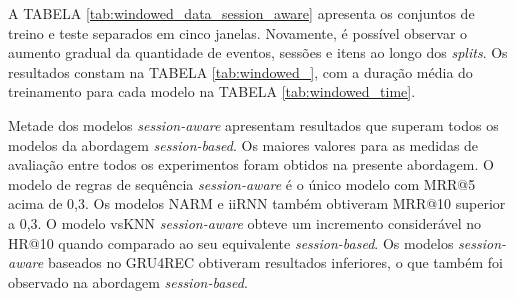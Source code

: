 A TABELA \ref{tab:windowed_data_session_aware} apresenta os conjuntos de treino
e teste separados em cinco janelas. Novamente, é possível observar o aumento
gradual da quantidade de eventos, sessões e itens ao longo dos \textit{splits}.
Os resultados constam na TABELA \ref{tab:windowed_}, com a duração
média do treinamento para cada modelo na TABELA \ref{tab:windowed_time}.

Metade dos modelos \textit{session-aware} apresentam resultados que superam
todos os modelos da abordagem \textit{session-based}. Os maiores valores para as
medidas de avaliação entre todos os experimentos foram obtidos na presente
abordagem. O modelo de regras de sequência \textit{session-aware} é o único
modelo com MRR@5 acima de 0,3. Os modelos NARM e iiRNN também obtiveram MRR@10
superior a 0,3. O modelo vsKNN \textit{session-aware} obteve um incremento
considerável no HR@10 quando comparado ao seu equivalente
\textit{session-based}. Os modelos \textit{session-aware} baseados no GRU4REC
obtiveram resultados inferiores, o que também foi observado na abordagem
\textit{session-based}.

